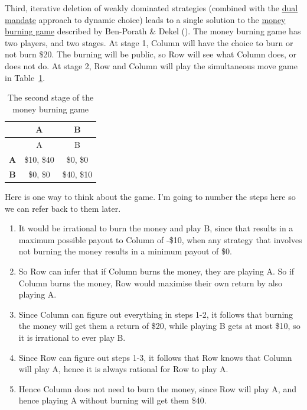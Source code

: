\documentclass[
  12pt,
  letterpaper,
  DIV=11,
  numbers=noendperiod]{scrreprt}
\providecommand{\tightlist}{%
  \setlength{\itemsep}{0pt}\setlength{\parskip}{0pt}}\usepackage{longtable,booktabs,array}
\begin{document}
Third, iterative deletion of weakly dominated strategies (combined with
the \href{dual.qmd}{dual mandate} approach to dynamic choice) leads to a
single solution to the \hyperref[tbl-money-burning]{money burning game}
described by Ben-Porath \& Dekel
(). The money burning game has
two players, and two stages. At stage 1, Column will have the choice to
burn or not burn \$20. The burning will be public, so Row will see what
Column does, or does not do. At stage 2, Row and Column will play the
simultaneous move game in Table~\ref{tbl-money-burning-part-two}.

\begin{longtable}[]{@{}ccc@{}}
\caption{The second stage of the money burning
game}\label{tbl-money-burning-part-two}\tabularnewline
\toprule\noalign{}
& A & B \\
\midrule\noalign{}
\endfirsthead
\toprule\noalign{}
& A & B \\
\midrule\noalign{}
\endhead
\bottomrule\noalign{}
\endlastfoot
\textbf{A} & \$10, \$40 & \$0, \$0 \\
\textbf{B} & \$0, \$0 & \$40, \$10 \\
\end{longtable}

Here is one way to think about the game. I'm going to number the steps
here so we can refer back to them later.

\begin{enumerate}
\def\labelenumi{\arabic{enumi}.}
\tightlist
\item
  It would be irrational to burn the money and play B, since that
  results in a maximum possible payout to Column of -\$10, when any
  strategy that involves not burning the money results in a minimum
  payout of \$0.
\item
  So Row can infer that if Column burns the money, they are playing A.
  So if Column burns the money, Row would maximise their own return by
  also playing A.
\item
  Since Column can figure out everything in steps 1-2, it follows that
  burning the money will get them a return of \$20, while playing B gets
  at most \$10, so it is irrational to ever play B.
\item
  Since Row can figure out steps 1-3, it follows that Row knows that
  Column will play A, hence it is always rational for Row to play A.
\item
  Hence Column does not need to burn the money, since Row will play A,
  and hence playing A without burning will get them \$40.
\end{enumerate}
\end{document}
